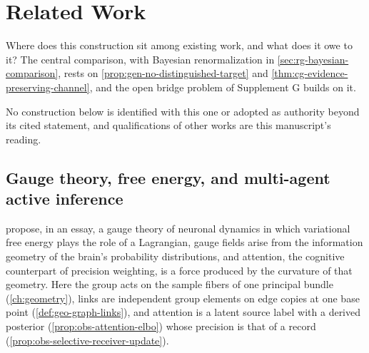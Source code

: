 \chapter{Related Work}
\label{ch:related-work}

Where does this construction sit among existing work, and what does it owe to
it? The central comparison, with Bayesian renormalization in
\cref{sec:rg-bayesian-comparison}, rests on
\cref{prop:gen-no-distinguished-target} and
\cref{thm:cg-evidence-preserving-channel}, and the open bridge problem of
Supplement G builds on it.

No construction below is identified with this one or adopted as authority
beyond its cited statement, and qualifications of other works are this
manuscript's reading. 

\section{Gauge theory, free energy, and multi-agent active inference}

\citet{Sengupta2016NeuronalGauge} propose, in an essay, a gauge theory of
neuronal dynamics in which variational free energy plays the role of a
Lagrangian, gauge fields arise from the information geometry of the brain's
probability distributions, and attention, the cognitive counterpart of
precision weighting, is a force produced by the curvature of that geometry.
Here the group acts on the sample fibers of one principal bundle
(\cref{ch:geometry}), links are independent group elements on edge copies at one
base point (\cref{def:geo-graph-links}), and attention is a latent source label
with a derived posterior (\cref{prop:obs-attention-elbo}) whose precision is
that of a record (\cref{prop:obs-selective-receiver-update}).

